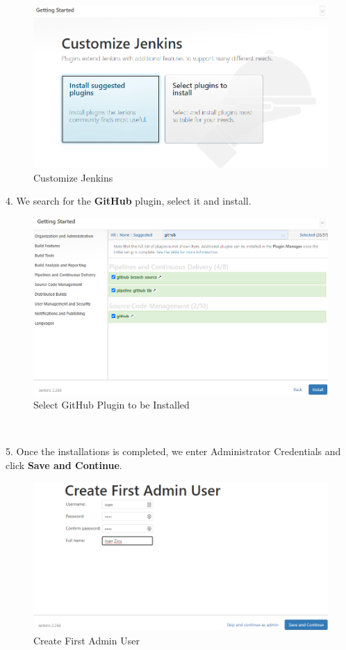 \documentclass[12pt,a4paper,twoside]{article}
\begin{document}
\begin{figure}[H]
    \centering
        \includegraphics[width=15cm]{images-aws/22-jenkins-select-plugin.png}
        \caption{Customize Jenkins}
\end{figure}


4. We search for the \textbf{GitHub} plugin, select it and install.


\begin{figure}[H]
    \centering
        \includegraphics[width=15cm]{images-aws/23-jenkins-select-github-plugin.png}
        \caption{Select GitHub Plugin to be Installed}
\end{figure}


~\newline


5. Once the installations is completed, we enter Administrator Credentials and click \textbf{Save and Continue}.


\begin{figure}[H]
    \centering
        \includegraphics[width=15cm]{images-aws/24-jenkins-admin-user.png}
        \caption{Create First Admin User}
\end{figure}
\end{document}
